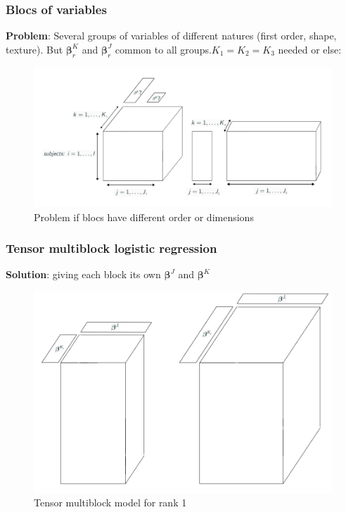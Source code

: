 \documentclass{beamer}
\begin{document}
\begin{frame}
 \frametitle{Blocs of variables}

 \textbf{Problem}: Several groups of variables of different natures (first order, shape, texture). But $\bm{\beta}_r^{K}$ and $\bm{\beta}_r^J$ common to all groups.$K_1 = K_2 = K_3$ needed or else:

 \begin{figure}
    \centering
    \includegraphics[scale = 0.23]{images/blocks_faux.png}
    \caption{Problem if blocs have different order or dimensions}
\end{figure}

\end{frame}


\begin{frame}
    \frametitle{Tensor multiblock logistic regression}
    \vspace{10 pt}
    \textbf{Solution}: giving each block its own $\bm{\beta}^J$ and $\bm{\beta}^K$\\[15 pt]
    \begin{figure}
        \centering
        \includegraphics[scale = 0.28]{images/beta_blocks.png}
        \caption{Tensor multiblock model for rank 1}
    \end{figure}
\end{frame}
\end{document}
